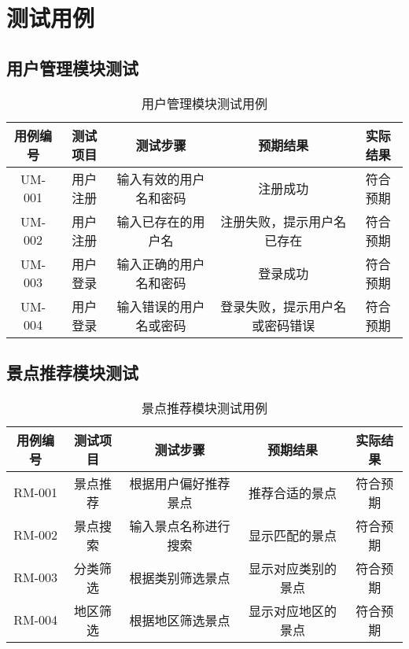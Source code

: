 \documentclass{ctexart}
\begin{document}
\section{测试用例}

\subsection{用户管理模块测试}
\begin{table}[H]
    \centering
    \caption{用户管理模块测试用例}
    \begin{tabular}{|c|c|c|c|c|}
        \hline
        \textbf{用例编号} & \textbf{测试项目} & \textbf{测试步骤} & \textbf{预期结果}   & \textbf{实际结果} \\
        \hline
        UM-001        & 用户注册          & 输入有效的用户名和密码   & 注册成功            & 符合预期          \\
        \hline
        UM-002        & 用户注册          & 输入已存在的用户名     & 注册失败，提示用户名已存在   & 符合预期          \\
        \hline
        UM-003        & 用户登录          & 输入正确的用户名和密码   & 登录成功            & 符合预期          \\
        \hline
        UM-004        & 用户登录          & 输入错误的用户名或密码   & 登录失败，提示用户名或密码错误 & 符合预期          \\
        \hline
    \end{tabular}
\end{table}

\subsection{景点推荐模块测试}
\begin{table}[H]
    \centering
    \caption{景点推荐模块测试用例}
    \begin{tabular}{|c|c|c|c|c|}
        \hline
        \textbf{用例编号} & \textbf{测试项目} & \textbf{测试步骤} & \textbf{预期结果} & \textbf{实际结果} \\
        \hline
        RM-001        & 景点推荐          & 根据用户偏好推荐景点    & 推荐合适的景点       & 符合预期          \\
        \hline
        RM-002        & 景点搜索          & 输入景点名称进行搜索    & 显示匹配的景点       & 符合预期          \\
        \hline
        RM-003        & 分类筛选          & 根据类别筛选景点      & 显示对应类别的景点     & 符合预期          \\
        \hline
        RM-004        & 地区筛选          & 根据地区筛选景点      & 显示对应地区的景点     & 符合预期          \\
        \hline
    \end{tabular}
\end{table}
\end{document}
